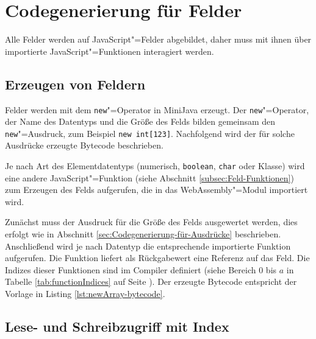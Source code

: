

\section{Codegenerierung für Felder}
Alle Felder werden auf JavaScript"=Felder abgebildet, daher muss mit ihnen über importierte JavaScript"=Funktionen interagiert werden.

\subsection{Erzeugen von Feldern}
\label{subsec:Erzeugen-von-Feldern}

Felder werden mit dem \lstinline{new}"=Operator in MiniJava erzeugt. Der \lstinline{new}"=Operator, der Name des Datentyps und die Größe des Felds bilden gemeinsam den \lstinline{new}"=Ausdruck, zum Beispiel \lstinline{new int[123]}. Nachfolgend wird der für solche Ausdrücke erzeugte Bytecode beschrieben.

Je nach Art des Elementdatentyps (numerisch, \lstinline{boolean}, \lstinline{char} oder Klasse) wird eine andere JavaScript"=Funktion (siehe Abschnitt \ref{subsec:Feld-Funktionen}) zum Erzeugen des Felds aufgerufen, die in das WebAssembly"=Modul importiert wird.

Zunächst muss der Ausdruck für die Größe des Felds ausgewertet werden, dies erfolgt wie in Abschnitt \ref{sec:Codegenerierung-für-Ausdrücke} beschrieben. Anschließend wird je nach Datentyp die entsprechende importierte Funktion aufgerufen. Die Funktion liefert als Rückgabewert eine Referenz auf das Feld. Die Indizes dieser Funktionen sind im Compiler definiert (siehe Bereich $0$ bis $a$ in Tabelle \ref{tab:functionIndices} auf Seite \pageref{tab:functionIndices}). Der erzeugte Bytecode entspricht der Vorlage in Listing \ref{lst:newArray-bytecode}.



\subsection{Lese- und Schreibzugriff mit Index}
\label{subsec:Lese-und-Schreibzugriff-mit-Index}


